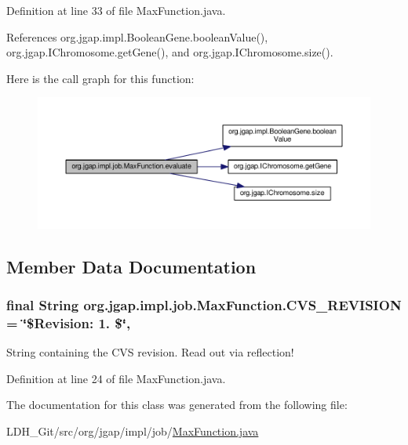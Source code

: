 Definition at line 33 of file Max\-Function.\-java.



References org.\-jgap.\-impl.\-Boolean\-Gene.\-boolean\-Value(), org.\-jgap.\-I\-Chromosome.\-get\-Gene(), and org.\-jgap.\-I\-Chromosome.\-size().



Here is the call graph for this function\-:
\nopagebreak
\begin{figure}[H]
\begin{center}
\leavevmode
\includegraphics[width=350pt]{classorg_1_1jgap_1_1impl_1_1job_1_1_max_function_a6b0344c8642af9170743d9be9a6509b8_cgraph}
\end{center}
\end{figure}




\subsection{Member Data Documentation}
\hypertarget{classorg_1_1jgap_1_1impl_1_1job_1_1_max_function_ae8a3e1c36accdbd1489ced756ca26690}{
\subsubsection[{C\-V\-S\-\_\-\-R\-E\-V\-I\-S\-I\-O\-N}]{\setlength{\rightskip}{0pt plus 5cm}final String org.\-jgap.\-impl.\-job.\-Max\-Function.\-C\-V\-S\-\_\-\-R\-E\-V\-I\-S\-I\-O\-N = \char`\"{}\$Revision\-: 1. \$\char`\"{}\hspace{0.3cm}{\ttfamily [static]}, {\ttfamily [private]}}}\label{classorg_1_1jgap_1_1impl_1_1job_1_1_max_function_ae8a3e1c36accdbd1489ced756ca26690}
String containing the C\-V\-S revision. Read out via reflection! 

Definition at line 24 of file Max\-Function.\-java.



The documentation for this class was generated from the following file\-:\begin{DoxyCompactItemize}
\item 
L\-D\-H\-\_\-\-Git/src/org/jgap/impl/job/\hyperlink{src_2org_2jgap_2impl_2job_2_max_function_8java}{Max\-Function.\-java}\end{DoxyCompactItemize}

